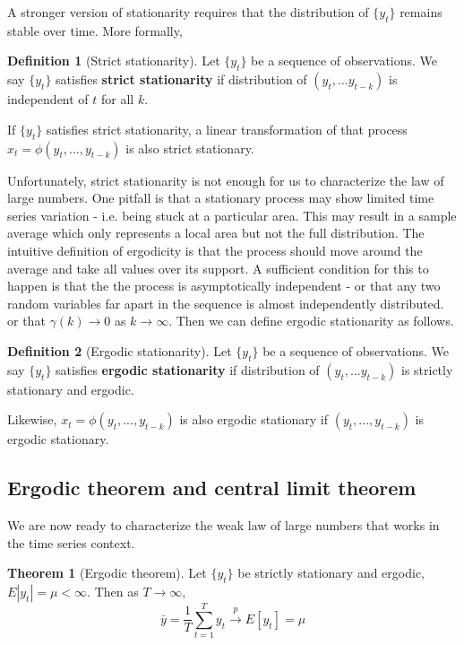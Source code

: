 \documentclass[12pt]{article}
\theoremstyle{definition}
\newtheorem{definition}{Definition}[section]
\theoremstyle{property}
\theoremstyle{assumption}
\theoremstyle{example}
\theoremstyle{comment}
\newtheorem{theorem}{Theorem}[section]
\begin{document}
\par
A stronger version of stationarity requires that the distribution of $\{y_t\}$ remains stable over time. More formally, 
\begin{mdframed}[backgroundcolor=blue!5] 
\begin{definition}[Strict stationarity]
Let $\{y_t\}$ be a sequence of observations. We say $\{y_t\}$ satisfies \textbf{strict stationarity} if distribution of $(y_t,...y_{t-k})$ is independent of $t$ for all $k$. 
\end{definition}
\end{mdframed}
If $\{y_t\}$ satisfies strict stationarity, a linear transformation of that process $x_t = \phi(y_t,...,y_{t-k})$ is also strict stationary. 
\par
Unfortunately, strict stationarity is not enough for us to characterize the law of large numbers. One pitfall is that a stationary process may show limited time series variation - i.e. being stuck at a particular area. This may result in a sample average which only represents a local area but not the full distribution. The intuitive definition of ergodicity is that the process should move around the average and take all values over its support. A sufficient condition for this to happen is that the the process is asymptotically independent - or that any two random variables far apart in the sequence is almost independently distributed. or that $\gamma(k)\to 0$ as $k\to\infty$. Then we can define ergodic stationarity as follows.
\begin{mdframed}[backgroundcolor=blue!5] 
\begin{definition}[Ergodic stationarity]
Let $\{y_t\}$ be a sequence of observations. We say $\{y_t\}$ satisfies \textbf{ergodic stationarity} if distribution of $(y_t,...y_{t-k})$ is strictly stationary and ergodic. 
\end{definition}
\end{mdframed}
Likewise, $x_t=\phi(y_t,...,y_{t-k})$ is also ergodic stationary if $(y_t,...,y_{t-k})$ is ergodic stationary.
\par
\subsection{Ergodic theorem and central limit theorem}
We are now ready to characterize the weak law of large numbers that works in the time series context.
\begin{mdframed}[backgroundcolor=green!5] 
\begin{theorem}[Ergodic theorem]
Let $\{y_t\}$ be strictly stationary and ergodic, $E|y_t|=\mu<\infty$. Then as $T\to \infty$, 
\[
\bar{y} = \frac{1}{T}\sum_{t=1}^T y_t  \xrightarrow{p} E[y_t]=\mu
\]
\end{theorem}
\end{mdframed}
\end{document}
